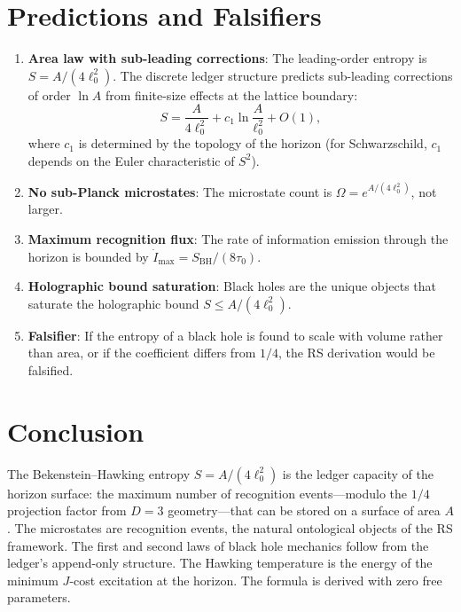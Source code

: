 \documentclass[12pt,a4paper]{article}
\theoremstyle{definition}
\theoremstyle{remark}
\begin{document}
\section{Predictions and Falsifiers}
\label{sec:predictions}

\begin{enumerate}
  \item \textbf{Area law with sub-leading corrections}:
  The leading-order entropy is $S = A/(4\ell_0^2)$.  The
  discrete ledger structure predicts sub-leading corrections
  of order $\ln A$ from finite-size effects at the lattice
  boundary:
  \begin{equation}
    S = \frac{A}{4\ell_0^2} + c_1 \ln\frac{A}{\ell_0^2}
    + O(1),
  \end{equation}
  where $c_1$ is determined by the topology of the horizon
  (for Schwarzschild, $c_1$ depends on the Euler
  characteristic of $S^2$).

  \item \textbf{No sub-Planck microstates}: The microstate
  count is $\Omega = e^{A/(4\ell_0^2)}$, not larger.

  \item \textbf{Maximum recognition flux}: The rate of
  information emission through the horizon is bounded by
  $\dot{I}_{\max} = S_{\mathrm{BH}}/(8\tau_0)$.

  \item \textbf{Holographic bound saturation}: Black holes
  are the unique objects that saturate the holographic bound
  $S \leq A/(4\ell_0^2)$.

  \item \textbf{Falsifier}: If the entropy of a black hole
  is found to scale with volume rather than area, or if the
  coefficient differs from $1/4$, the RS derivation would
  be falsified.
\end{enumerate}

\section{Conclusion}
\label{sec:conclusion}

The Bekenstein--Hawking entropy $S = A/(4\ell_0^2)$ is the
ledger capacity of the horizon surface: the maximum number
of recognition events---modulo the $1/4$ projection factor
from $D = 3$ geometry---that can be stored on a surface of
area $A$.  The microstates are recognition events, the
natural ontological objects of the RS framework.  The first
and second laws of black hole mechanics follow from the
ledger's append-only structure.  The Hawking temperature is
the energy of the minimum $J$-cost excitation at the horizon.
The formula is derived with zero free parameters.
\end{document}
